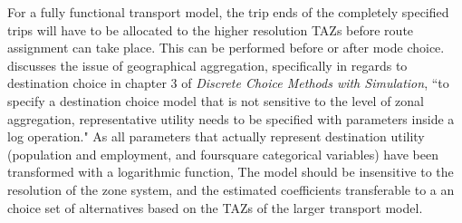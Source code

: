 For a fully functional transport model, the trip ends of the completely specified trips will have to be allocated to the higher resolution TAZs before route assignment can take place. This can be performed before or after mode choice. \textcite{Train09} discusses the issue of geographical aggregation, specifically in regards to destination choice in chapter 3 of \textit{Discrete Choice Methods with Simulation}, 
``to specify a destination choice model that is not sensitive to the level of zonal aggregation, representative utility needs to be specified with parameters inside a log operation."
As all parameters that actually represent destination utility (population and employment, and foursquare categorical variables) have been transformed with a logarithmic function, The model should be insensitive to the resolution of the zone system, and the estimated coefficients transferable to a an choice set of alternatives based on the TAZs of the larger transport model.

